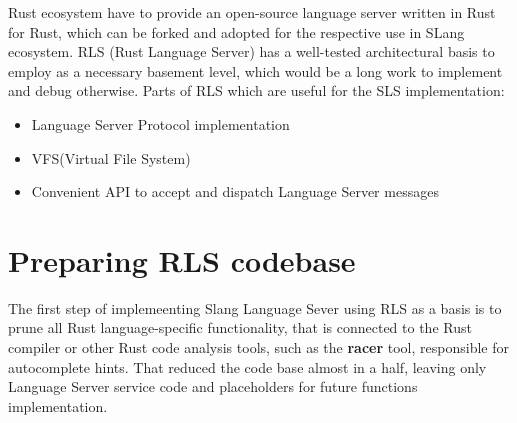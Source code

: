 Rust ecosystem have to provide an open-source language server written in Rust for Rust,
which can be forked and adopted for the respective use in SLang ecosystem.
RLS (Rust Language Server) has a well-tested architectural basis to employ as a necessary basement level,
which would be a long work to implement and debug otherwise.
Parts of RLS which are useful for the SLS implementation:
\begin{itemize}
    \item Language Server Protocol implementation
    \item VFS(Virtual File System)
    \item Convenient API to accept and dispatch Language Server messages
\end{itemize}

\section{Preparing RLS codebase}

The first step of implemeenting Slang Language Sever using RLS as a basis is to prune all Rust language-specific functionality,
that is connected to the Rust compiler or other Rust code analysis tools, such as the \textbf{racer} tool, responsible for autocomplete hints.
That reduced the code base almost in a half, leaving only Language Server service code and placeholders for future functions implementation.

